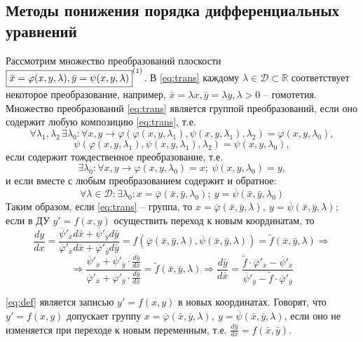 \subsection{Методы понижения порядка дифференциальных уравнений}
\begin{proposition}

	Рассмотрим множество преобразований плоскости \\ $ \boxed{\bar{x} = \varphi(x, y, \lambda), \bar{y} = \psi (x, y, \lambda)}^{\eqnum\label{eq:trans}} $. В \eqref{eq:trans} каждому $ \lambda \in \mathcal{ D }  \subset \mathbb{ R } $ соответствует некоторое преобразование, например, $ \bar{x} = \lambda x, \bar{y} = \lambda y, \lambda > 0 $ -- гомотетия. Множество преобразований \eqref{eq:trans}  является группой преобразований, если оно содержит любую композицию \eqref{eq:trans}, т.е. 
	\[ \forall \lambda_1, \lambda_2 \, \exists \lambda_0 : \forall x, y \rightarrow \varphi(\varphi(x, y, \lambda_1), \psi(x, y, \lambda_1), \lambda_2) = \varphi(x, y, \lambda_0),\]
	\[ \psi(\varphi(x, y, \lambda_1), \psi(x, y, \lambda_1), \lambda_2) = \psi(x, y, \lambda_0),\]
	если содержит тождественное преобразование, т.е. 
	\[ \exists \lambda_0: \forall x, y \rightarrow \varphi(x, y, \lambda_0) = x; \ \psi(x, y, \lambda_0) = y,\]
	и если вместе с любым преобразованием содержит и обратное: 
	\[ \forall \lambda \in \mathcal{D} \colon \exists \lambda_0 \colon x = \overline{\varphi}  (\bar{x}, \bar{y}, \lambda_0); \ y = \overline{\psi} (\bar{x}, \bar{y}, \lambda_0) \]
	Таким образом, если \eqref{eq:trans} -- группа, то $ x = \overline{\varphi} (\bar{x}, \bar{y}, \lambda), \ y = \overline{\psi}  (\bar{x}, \bar{y}, \lambda);$ если в ДУ $ y' = f(x, y)$ осуществить переход к новым координатам, то \\
	$$
	\frac{dy}{dx} = \frac{ \overline{\psi}'_{ \bar{x} } d\bar{x} +  \overline{\psi}'_{ \bar{y} } d\bar{y} }{ \overline{\varphi}'_{\bar{x}} d\bar{x} + \overline{\varphi}'_{\bar{y}} d\bar{y}} = f(\overline{ \varphi }(\bar{x}, \bar{y}, \lambda), \overline{ \psi }(\bar{x}, \bar{y}, \lambda)) = \tilde{f}(\bar{x}, \bar{y}, \lambda) \Rightarrow
	$$	
	\begin{equation} \label{eq:def}
	\Rightarrow \frac{ \overline{\psi}'_{ \bar{x} } + \overline{\psi}'_{ \bar{y} } \cdot \frac{d\bar{y}}{d\bar{x}} }{ \overline{\varphi}'_{\bar{x}} + \overline{\varphi}'_{\bar{y}} \cdot \frac{d\bar{y}}{d\bar{x}} } = \tilde{f}(\bar{x}, \bar{y}, \lambda) \Rightarrow \frac{d\bar{y}}{d\bar{x}} = \frac{\tilde{f} \cdot  \overline{\varphi}'_{\bar{x}} - \overline{\psi}'_{\bar{x} } }{ \overline{\psi}'_{\bar{y}} - \tilde{f} \cdot \overline{\varphi}'_{\bar{y}}}
	\end{equation}  
	
	\eqref{eq:def} является записью $ y' = f(x, y) $ в новых координатах. Говорят, что $ y' = f(x, y) $ допускает группу $ x = \overline{\varphi} (\bar{x}, \bar{y}, \lambda), \ y =  \overline{\psi} (\bar{x}, \bar{y}, \lambda)$, если оно не изменяется при переходе к новым переменным, т.е. $ \frac{d\bar{y}}{d\bar{x}} = f(\bar{x}, \bar{y}) $.
\end{proposition}

